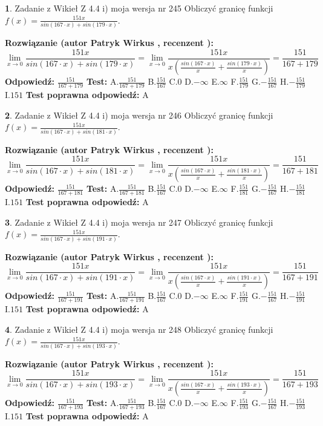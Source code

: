 \documentclass[12pt, a4paper]{article}
\theoremstyle{definition} %
\newtheorem{zad}{}
\newcommand{\zadStart}[1]{\begin{zad}#1\newline}
\newcommand{\zadStop}{\end{zad}}
\newcommand{\rozwStart}[2]{\noindent \textbf{Rozwiązanie (autor #1 , recenzent #2): }\newline}
\newcommand{\rozwStop}{\newline}
\newcommand{\odpStart}{\noindent \textbf{Odpowiedź:}\newline}
\newcommand{\odpStop}{\newline}
\newcommand{\testStart}{\noindent \textbf{Test:}\newline}
\newcommand{\testStop}{\newline}
\newcommand{\kluczStart}{\noindent \textbf{Test poprawna odpowiedź:}\newline}
\newcommand{\kluczStop}{\newline}
\begin{document}
\zadStart{Zadanie z Wikieł Z 4.4 i) moja wersja nr 245}
Obliczyć granicę funkcji $f(x)=\frac{151x}{sin(167\cdot x) +sin(179\cdot x)}$.
\zadStop
\rozwStart{Patryk Wirkus}{}
$$\lim\limits_{x\to 0}\frac{151x}{sin(167\cdot x) +sin(179\cdot x)}=\lim\limits_{x\to 0}\frac{151x}{x(\frac{sin(167\cdot x)}{x}+\frac{sin(179\cdot x)}{x})}=\frac{151}{167+179}$$
\rozwStop
\odpStart
$\frac{151}{167+179}$
\odpStop
\testStart
A.$\frac{151}{167+179}$
B.$\frac{151}{167}$
C.$0$
D.$-\infty$
E.$\infty$
F.$\frac{151}{179}$
G.$-\frac{151}{167}$
H.$-\frac{151}{179}$
I.$151$
\testStop
\kluczStart
A
\kluczStop



\zadStart{Zadanie z Wikieł Z 4.4 i) moja wersja nr 246}
Obliczyć granicę funkcji $f(x)=\frac{151x}{sin(167\cdot x) +sin(181\cdot x)}$.
\zadStop
\rozwStart{Patryk Wirkus}{}
$$\lim\limits_{x\to 0}\frac{151x}{sin(167\cdot x) +sin(181\cdot x)}=\lim\limits_{x\to 0}\frac{151x}{x(\frac{sin(167\cdot x)}{x}+\frac{sin(181\cdot x)}{x})}=\frac{151}{167+181}$$
\rozwStop
\odpStart
$\frac{151}{167+181}$
\odpStop
\testStart
A.$\frac{151}{167+181}$
B.$\frac{151}{167}$
C.$0$
D.$-\infty$
E.$\infty$
F.$\frac{151}{181}$
G.$-\frac{151}{167}$
H.$-\frac{151}{181}$
I.$151$
\testStop
\kluczStart
A
\kluczStop



\zadStart{Zadanie z Wikieł Z 4.4 i) moja wersja nr 247}
Obliczyć granicę funkcji $f(x)=\frac{151x}{sin(167\cdot x) +sin(191\cdot x)}$.
\zadStop
\rozwStart{Patryk Wirkus}{}
$$\lim\limits_{x\to 0}\frac{151x}{sin(167\cdot x) +sin(191\cdot x)}=\lim\limits_{x\to 0}\frac{151x}{x(\frac{sin(167\cdot x)}{x}+\frac{sin(191\cdot x)}{x})}=\frac{151}{167+191}$$
\rozwStop
\odpStart
$\frac{151}{167+191}$
\odpStop
\testStart
A.$\frac{151}{167+191}$
B.$\frac{151}{167}$
C.$0$
D.$-\infty$
E.$\infty$
F.$\frac{151}{191}$
G.$-\frac{151}{167}$
H.$-\frac{151}{191}$
I.$151$
\testStop
\kluczStart
A
\kluczStop



\zadStart{Zadanie z Wikieł Z 4.4 i) moja wersja nr 248}
Obliczyć granicę funkcji $f(x)=\frac{151x}{sin(167\cdot x) +sin(193\cdot x)}$.
\zadStop
\rozwStart{Patryk Wirkus}{}
$$\lim\limits_{x\to 0}\frac{151x}{sin(167\cdot x) +sin(193\cdot x)}=\lim\limits_{x\to 0}\frac{151x}{x(\frac{sin(167\cdot x)}{x}+\frac{sin(193\cdot x)}{x})}=\frac{151}{167+193}$$
\rozwStop
\odpStart
$\frac{151}{167+193}$
\odpStop
\testStart
A.$\frac{151}{167+193}$
B.$\frac{151}{167}$
C.$0$
D.$-\infty$
E.$\infty$
F.$\frac{151}{193}$
G.$-\frac{151}{167}$
H.$-\frac{151}{193}$
I.$151$
\testStop
\kluczStart
A
\kluczStop
\end{document}
